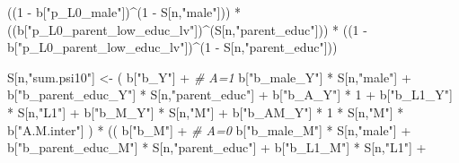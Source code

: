 \documentclass[
]{book}
\newenvironment{Shaded}{\begin{snugshade}}{\end{snugshade}}
\newcommand{\CommentTok}[1]{\textcolor[rgb]{0.56,0.35,0.01}{\textit{#1}}}
\newcommand{\DecValTok}[1]{\textcolor[rgb]{0.00,0.00,0.81}{#1}}
\newcommand{\NormalTok}[1]{#1}
\newcommand{\OtherTok}[1]{\textcolor[rgb]{0.56,0.35,0.01}{#1}}
\newcommand{\SpecialCharTok}[1]{\textcolor[rgb]{0.00,0.00,0.00}{#1}}
\newcommand{\StringTok}[1]{\textcolor[rgb]{0.31,0.60,0.02}{#1}}
\begin{document}
\begin{Shaded}
\begin{Highlighting}[]
\NormalTok{      ((}\DecValTok{1} \SpecialCharTok{{-}}\NormalTok{ b[}\StringTok{"p\_L0\_male"}\NormalTok{])}\SpecialCharTok{\^{}}\NormalTok{(}\DecValTok{1} \SpecialCharTok{{-}}\NormalTok{ S[n,}\StringTok{"male"}\NormalTok{])) }\SpecialCharTok{*} 
\NormalTok{      ((b[}\StringTok{"p\_L0\_parent\_low\_educ\_lv"}\NormalTok{])}\SpecialCharTok{\^{}}\NormalTok{(S[n,}\StringTok{"parent\_educ"}\NormalTok{])) }\SpecialCharTok{*}
\NormalTok{      ((}\DecValTok{1} \SpecialCharTok{{-}}\NormalTok{ b[}\StringTok{"p\_L0\_parent\_low\_educ\_lv"}\NormalTok{])}\SpecialCharTok{\^{}}\NormalTok{(}\DecValTok{1} \SpecialCharTok{{-}}\NormalTok{ S[n,}\StringTok{"parent\_educ"}\NormalTok{])) }
    
\NormalTok{    S[n,}\StringTok{"sum.psi10"}\NormalTok{] }\OtherTok{\textless{}{-}}\NormalTok{  ( b[}\StringTok{"b\_Y"}\NormalTok{] }\SpecialCharTok{+}                                           \CommentTok{\# A=1}
\NormalTok{                             b[}\StringTok{"b\_male\_Y"}\NormalTok{] }\SpecialCharTok{*}\NormalTok{ S[n,}\StringTok{"male"}\NormalTok{] }\SpecialCharTok{+} 
\NormalTok{                             b[}\StringTok{"b\_parent\_educ\_Y"}\NormalTok{] }\SpecialCharTok{*}\NormalTok{ S[n,}\StringTok{"parent\_educ"}\NormalTok{] }\SpecialCharTok{+} 
\NormalTok{                             b[}\StringTok{"b\_A\_Y"}\NormalTok{] }\SpecialCharTok{*} \DecValTok{1} \SpecialCharTok{+} 
\NormalTok{                             b[}\StringTok{"b\_L1\_Y"}\NormalTok{] }\SpecialCharTok{*}\NormalTok{ S[n,}\StringTok{"L1"}\NormalTok{] }\SpecialCharTok{+}
\NormalTok{                             b[}\StringTok{"b\_M\_Y"}\NormalTok{] }\SpecialCharTok{*}\NormalTok{ S[n,}\StringTok{"M"}\NormalTok{] }\SpecialCharTok{+}
\NormalTok{                             b[}\StringTok{"b\_AM\_Y"}\NormalTok{] }\SpecialCharTok{*} \DecValTok{1} \SpecialCharTok{*}\NormalTok{ S[n,}\StringTok{"M"}\NormalTok{] }\SpecialCharTok{*}\NormalTok{ b[}\StringTok{"A.M.inter"}\NormalTok{] ) }\SpecialCharTok{*}
\NormalTok{      (( b[}\StringTok{"b\_M"}\NormalTok{] }\SpecialCharTok{+}                                                             \CommentTok{\# A\textquotesingle{}=0}
\NormalTok{           b[}\StringTok{"b\_male\_M"}\NormalTok{] }\SpecialCharTok{*}\NormalTok{ S[n,}\StringTok{"male"}\NormalTok{] }\SpecialCharTok{+} 
\NormalTok{           b[}\StringTok{"b\_parent\_educ\_M"}\NormalTok{] }\SpecialCharTok{*}\NormalTok{ S[n,}\StringTok{"parent\_educ"}\NormalTok{] }\SpecialCharTok{+} 
\NormalTok{           b[}\StringTok{"b\_L1\_M"}\NormalTok{] }\SpecialCharTok{*}\NormalTok{ S[n,}\StringTok{"L1"}\NormalTok{] }\SpecialCharTok{+}

\end{Highlighting}
\end{Shaded}
\end{document}
